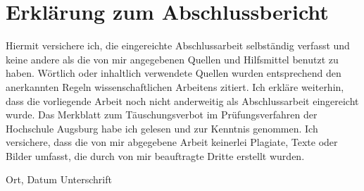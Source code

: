 \documentclass[oneside]{wissdoc}
\begin{document}
\clearpage


\graphicspath{{figures/}}


  
     







\appendix





\printglossary[type=\acronymtype,title={Abkürzungen}]
\printglossary[type=main]

\clearpage

\listoffigures
{}
\clearpage

\listoftables
{}
\clearpage



\ifnotonesideelse{\cleardoublepage}{}

%
%
\printbibliography 






\clearpage
\chapter*{Erklärung zum Abschlussbericht}
Hiermit versichere ich, die eingereichte Abschlussarbeit selbständig verfasst und keine andere als die von mir angegebenen Quellen und Hilfsmittel benutzt zu haben. Wörtlich oder inhaltlich verwendete Quellen wurden entsprechend den anerkannten Regeln wissenschaftlichen Arbeitens zitiert. Ich erkläre weiterhin, dass die vorliegende Arbeit noch nicht anderweitig als Abschlussarbeit eingereicht wurde. Das Merkblatt zum Täuschungsverbot im Prüfungsverfahren der Hochschule Augsburg habe ich gelesen und zur Kenntnis genommen. Ich versichere, dass die von mir abgegebene Arbeit keinerlei Plagiate, Texte oder Bilder umfasst, die durch von mir beauftragte Dritte erstellt wurden.

\vspace{4cm}

\hspace{2cm} Ort, Datum \hfill Unterschrift \hspace{2cm}
\end{document}
